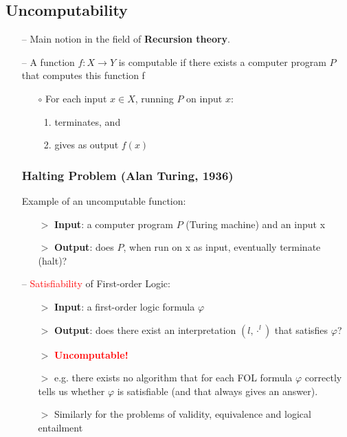 \subsection{Uncomputability}
\begin{itemize}
    \item[--] Main notion in the field of \textbf{Recursion theory}. 
    \item[--] A function $f: X \rightarrow Y$ is \textcolor{PineGreen}{computable} if there exists a computer program $P$ that computes this function f 
    \begin{itemize}
        \item[$\circ$] For each input $x \in X$, running $P$ on input $x$:
        \begin{enumerate}
            \item terminates, and
            \item gives as output $f(x)$
        \end{enumerate}
    \end{itemize}
    \subsubsection{Halting Problem (Alan Turing, 1936)} 
    Example of an uncomputable function:
    \begin{itemize}
        \item[$>$] \textbf{Input}: a computer program $P$ (Turing machine) and an input x
        \item[$>$] \textbf{Output}: does $P$, when run on x as input, eventually terminate (halt)?
    \end{itemize}
    \newpage
    \item[--] \textcolor{red}{Satisfiability} of First-order Logic:
    \begin{itemize}
        \item[$>$] \textbf{Input}: a first-order logic formula $\varphi$
        \item[$>$] \textbf{Output}: does there exist an interpretation $(l, \cdot^l)$ that satisfies $\varphi$?
        \\
        \item[$>$] \textbf{\textcolor{red}{Uncomputable!}}
        \item[$>$] e.g. there exists no algorithm that for each FOL formula $\varphi$ correctly tells us whether $\varphi$ is satisfiable (and that always gives an answer).
        \item[$>$] Similarly for the problems of \textcolor{PineGreen}{validity}, \textcolor{PineGreen}{equivalence} and \textcolor{PineGreen}{logical entailment}
    \end{itemize}
\end{itemize}

